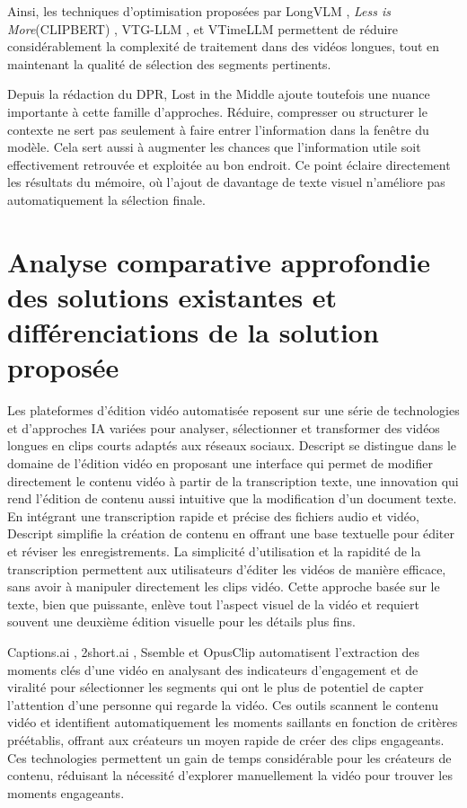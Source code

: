 Ainsi, les techniques d’optimisation proposées par LongVLM \cite{weng2024}, \textit{Less is More}(CLIPBERT) \cite{lei2021_clipbert}, VTG-LLM \cite{guo2024_vtgLLM}, et VTimeLLM \cite{huang2024_vtimeLLM} permettent de réduire considérablement la complexité de traitement dans des vidéos longues, tout en maintenant la qualité de sélection des segments pertinents.

Depuis la rédaction du DPR, Lost in the Middle \cite{liu2024_lost} ajoute toutefois une nuance importante à cette famille d'approches. Réduire, compresser ou structurer le contexte ne sert pas seulement à faire entrer l'information dans la fenêtre du modèle. Cela sert aussi à augmenter les chances que l'information utile soit effectivement retrouvée et exploitée au bon endroit. Ce point éclaire directement les résultats du mémoire, où l'ajout de davantage de texte visuel n'améliore pas automatiquement la sélection finale.

\section{Analyse comparative approfondie des solutions existantes et différenciations de la solution proposée}

Les plateformes d’édition vidéo automatisée reposent sur une série de technologies et d’approches IA variées pour analyser, sélectionner et transformer des vidéos longues en clips courts adaptés aux réseaux sociaux. Descript \cite{descript2024} se distingue dans le domaine de l’édition vidéo en proposant une interface qui permet de modifier directement le contenu vidéo à partir de la transcription texte, une innovation qui rend l’édition de contenu aussi intuitive que la modification d’un document texte. En intégrant une transcription rapide et précise des fichiers audio et vidéo, Descript simplifie la création de contenu en offrant une base textuelle pour éditer et réviser les enregistrements. La simplicité d’utilisation et la rapidité de la transcription permettent aux utilisateurs d’éditer les vidéos de manière efficace, sans avoir à manipuler directement les clips vidéo. Cette approche basée sur le texte, bien que puissante, enlève tout l’aspect visuel de la vidéo et requiert souvent une deuxième édition visuelle pour les détails plus fins.

Captions.ai \cite{captions2024}, 2short.ai \cite{short2024}, Ssemble \cite{ssemble2024} et OpusClip \cite{opusclip2024} automatisent l’extraction des moments clés d’une vidéo en analysant des indicateurs d’engagement et de viralité pour sélectionner les segments qui ont le plus de potentiel de capter l’attention d’une personne qui regarde la vidéo. Ces outils scannent le contenu vidéo et identifient automatiquement les moments saillants en fonction de critères préétablis, offrant aux créateurs un moyen rapide de créer des clips engageants. Ces technologies permettent un gain de temps considérable pour les créateurs de contenu, réduisant la nécessité d’explorer manuellement la vidéo pour trouver les moments engageants.

